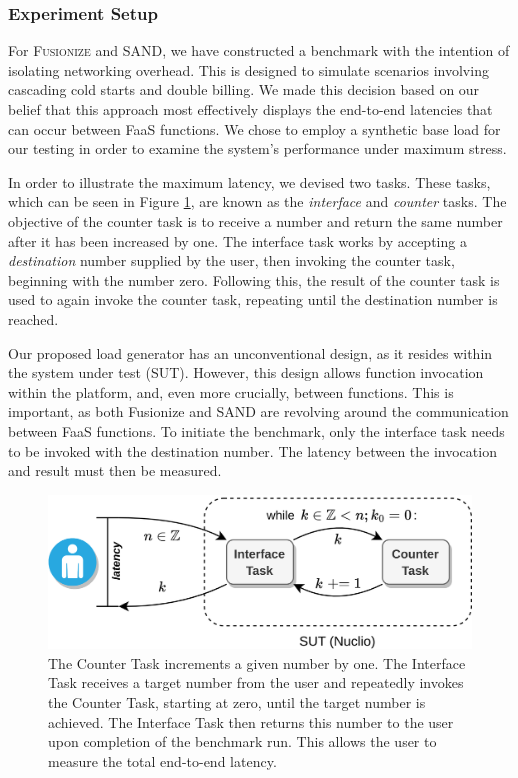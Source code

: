 \subsubsection{Experiment Setup}

For \textsc{Fusionize} and SAND, we have constructed a benchmark with the
intention of isolating networking overhead. This is designed to simulate scenarios
involving cascading cold starts and double billing. We made this decision based
on our belief that this approach most effectively displays the end-to-end
latencies that can occur between FaaS functions. We chose to employ a synthetic
base load for our testing in order to examine the system's performance under
maximum stress.

In order to illustrate the maximum latency, we devised two tasks. These tasks,
which can be seen in Figure \ref{fig:bench}, are known as the \emph{interface}
and \emph{counter} tasks. The objective of the counter task is to receive a
number and return the same number after it has been increased by one. The
interface task works by accepting a \emph{destination} number supplied by the
user, then invoking the counter task, beginning with the number zero. Following
this, the result of the counter task is used to again invoke the counter task,
repeating until the destination number is reached.

Our proposed load generator has an unconventional design, as it resides within
the system under test (SUT). However, this design allows function invocation
within the platform, and, even more crucially, between functions. This is
important, as both Fusionize and SAND are revolving around the communication
between FaaS functions. To initiate the benchmark, only the interface task needs
to be invoked with the destination number. The latency between the invocation
and result must then be measured.

\begin{figure}
    \centering
    \includegraphics[width=\linewidth]{figures/bench}
    \caption{
        The Counter Task increments a given number by one. The Interface Task
        receives a target number from the user and repeatedly invokes the
        Counter Task, starting at zero, until the target number is achieved. The
        Interface Task then returns this number to the user upon completion of
        the benchmark run. This allows the user to measure the total end-to-end
        latency.
    }
    \label{fig:bench}
\end{figure}

